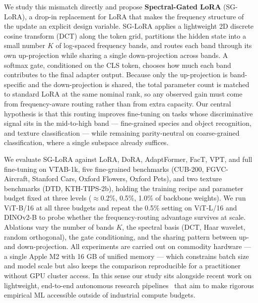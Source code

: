 \documentclass{article}
\begin{document}
We study this mismatch directly and propose \textbf{Spectral-Gated LoRA} (SG-LoRA), a drop-in replacement for LoRA that makes the frequency structure of the update an explicit design variable. SG-LoRA applies a lightweight 2D discrete cosine transform (DCT) along the token grid, partitions the hidden state into a small number $K$ of log-spaced frequency bands, and routes each band through its own up-projection while sharing a single down-projection across bands. A softmax gate, conditioned on the CLS token, chooses how much each band contributes to the final adapter output. Because only the up-projection is band-specific and the down-projection is shared, the total parameter count is matched to standard LoRA at the same nominal rank, so any observed gain must come from frequency-aware routing rather than from extra capacity. Our central hypothesis is that this routing improves fine-tuning on tasks whose discriminative signal sits in the mid-to-high band --- fine-grained species and object recognition, and texture classification --- while remaining parity-neutral on coarse-grained classification, where a single subspace already suffices.

We evaluate SG-LoRA against LoRA, DoRA, AdaptFormer, FacT, VPT, and full fine-tuning on VTAB-1k, five fine-grained benchmarks (CUB-200, FGVC-Aircraft, Stanford Cars, Oxford Flowers, Oxford Pets), and two texture benchmarks (DTD, KTH-TIPS-2b), holding the training recipe and parameter budget fixed at three levels ($\approx$0.2\%, 0.5\%, 1.0\% of backbone weights). We run ViT-B/16 at all three budgets and repeat the 0.5\% setting on ViT-L/16 and DINOv2-B to probe whether the frequency-routing advantage survives at scale. Ablations vary the number of bands $K$, the spectral basis (DCT, Haar wavelet, random orthogonal), the gate conditioning, and the sharing pattern between up- and down-projection. All experiments are carried out on commodity hardware --- a single Apple M2 with 16 GB of unified memory --- which constrains batch size and model scale but also keeps the comparison reproducible for a practitioner without GPU cluster access. In this sense our study sits alongside recent work on lightweight, end-to-end autonomous research pipelines~\citep{lu2024aiscientist, yamada2025aiscientistv2} that aim to make rigorous empirical ML accessible outside of industrial compute budgets.
\end{document}
